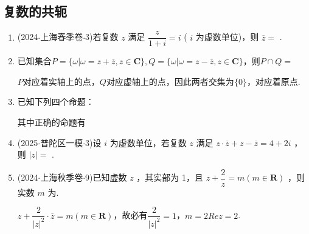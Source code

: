 \subsection*{复数的共轭}
\begin{enumerate}
    \item (2024$\cdot$上海春季卷$\cdot$3)若复数 $z$ 满足 $\dfrac{z}{1 + {i}} = {i}$ ( ${i}$ 为虚数单位)，则 $\overline{z} =$ .
    \item 已知集合$P = \{\omega | \omega = z + \overline{z}, z \in \mathbf{C}\}, Q = \{\omega | \omega = z - \overline{z}, z \in \mathbf{C}\}$，则$P \cap Q =$
    \begin{jieda}
        $P$对应着实轴上的点，$Q$对应虚轴上的点，因此两者交集为$\{0\}$，对应着原点.
    \end{jieda}
    \item 已知下列四个命题：
    其中正确的命题有
    \begin{jieda}
    \end{jieda}
    \item (2025$\cdot$普陀区一模$\cdot$3)设 ${i}$ 为虚数单位，若复数 $z$ 满足 $z \cdot  \overline{z} + z - \overline{z} = 4 + 2{i}$ ，则 $\left| z\right|  =$ .
    \item (2024$\cdot$上海秋季卷$\cdot$9)已知虚数 $z$ ，其实部为 1，且 $z + \dfrac{2}{z} = m\left( {m \in  \mathbf{R}}\right)$ ，则实数 $m$ 为.
    \begin{jieda}
        $z + \dfrac{2}{|z|^2} \cdot \overline{z} = m\left( {m \in  \mathbf{R}}\right)$，故必有$\dfrac{2}{|z|^2} = 1$，$m = 2Rez = 2$.
    \end{jieda}
\end{enumerate}

